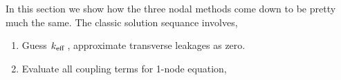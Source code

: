 \documentclass{school-22.211-notes}
\begin{document}
\clearpage
{}
In this section we show how the three nodal methods come down to be pretty much the same. The classic solution sequance involves,
\begin{enumerate}
\item Guess $\left. k_{\mathrm{eff}} \right.$, approximate transverse leakages as zero.
\item Evaluate all coupling terms for 1-node equation,


\end{enumerate}
\end{document}
